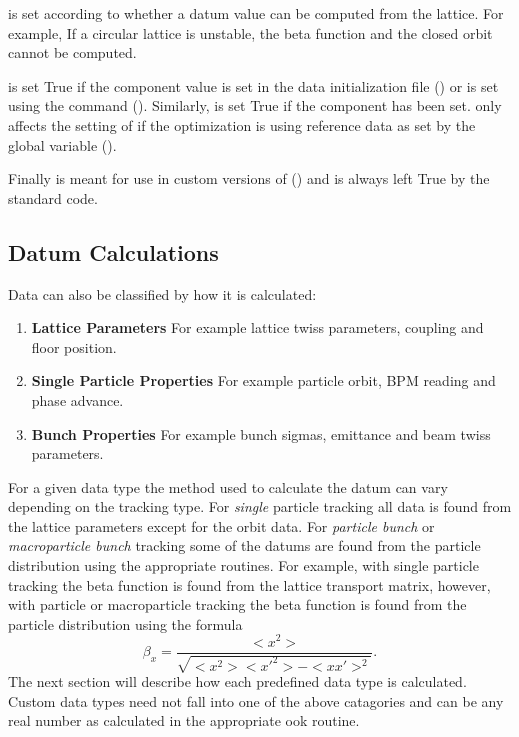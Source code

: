  is set according to whether a datum value can be
computed from the  lattice. For example, If a circular
lattice is unstable, the beta function and the closed orbit cannot be
computed.

 is set True if the  component value is set in
the data initialization file () or is set using the
 command (). Similarly,  is set True
if the  component has been set.  only affects the
setting of  if the optimization is using reference data
as set by the global variable  ().

Finally  is meant for use in custom versions of \tao
() and is always left True by the standard \tao code.


\subsection{Datum Calculations}
\label{s:datum.calc}

Data can also be classified by how it is calculated:
\vspace{-2ex}
\begin{enumerate}
  \item \textbf{Lattice Parameters} \Newline
    For example lattice twiss parameters, coupling and floor position.
  \item \textbf{Single Particle Properties} \Newline
    For example particle orbit, BPM reading and phase advance.
  \item \textbf{Bunch Properties} \Newline
    For example bunch sigmas, emittance and beam twiss parameters.
\end{enumerate}
For a given data type the method used to calculate the datum can vary
depending on the tracking type. For {\it single} particle tracking all
data is found from the lattice parameters except for the orbit
data. For \textit{particle bunch} or \textit{macroparticle bunch}
tracking some of the datums are found from the particle distribution
using the appropriate \bmad routines. For example, with single
particle tracking the beta function is found from the lattice
transport matrix, however, with particle or macroparticle tracking the
beta function is found from the particle distribution using the
formula
\begin{equation}
  \beta_x = \frac{<x^{2}>}{\sqrt{<x^{2}> <x'^{2}> - <x x'>^{2}}}.
\end{equation}
The next section will describe how each predefined data type is
calculated.  Custom data types need not fall into one of the above
catagories and can be any real number as calculated in the appropriate
ook routine.


